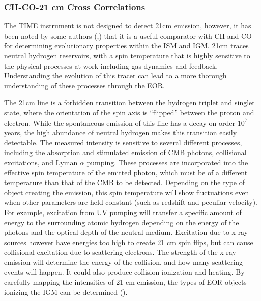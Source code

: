 \documentclass[manuscript]{aastex}
\begin{document}
\subsubsection{CII-CO-21 cm Cross Correlations}
The TIME instrument is not designed to detect 21cm emission, however, it has been noted by some authors (\cite{Zaroubi2012},\cite{Gong2012}) that it is a useful comparator with CII and CO for determining evolutionary properties within the ISM and IGM. 
21cm traces neutral hydrogen reservoirs, with a spin temperature that is highly sensitive to the physical processes at work including gas dynamics and feedback. Understanding the evolution of this tracer can lead to a more thorough understanding of these processes through the EOR. 

The 21cm line is a forbidden transition between the hydrogen triplet and singlet state, where the orientation of the spin axis is ``flipped'' between the proton and electron. While the spontaneous emission of this line has a decay on order $10^{7}$ years, the high abundance of neutral hydrogen makes this transition easily detectable. The measured intensity is sensitive to several different processes, including the absorption and stimulated emission of CMB photons, collisional excitations, and Lyman $\alpha$ pumping. These processes are incorporated into the effective spin temperature of the emitted photon, which must be of a different temperature than that of the CMB to be detected. Depending on the type of object creating the emission, this spin temperature will show fluctuations even when other parameters are held constant (such as redshift and peculiar velocity). For example, excitation from UV pumping will transfer a specific amount of energy to the surrounding atomic hydrogen depending on the energy of the photons and the optical depth of the neutral medium. Excitation due to x-ray sources however have energies too high to create 21 cm spin flips, but can cause collisional excitation due to scattering electrons. The strength of the x-ray emission will determine the energy of the collision, and how many scattering events will happen. It could also produce collision ionization and heating. By carefully mapping the intensities of 21 cm emission, the types of EOR objects ionizing the IGM can be determined (\cite{Zaroubi2012}).
\end{document}
